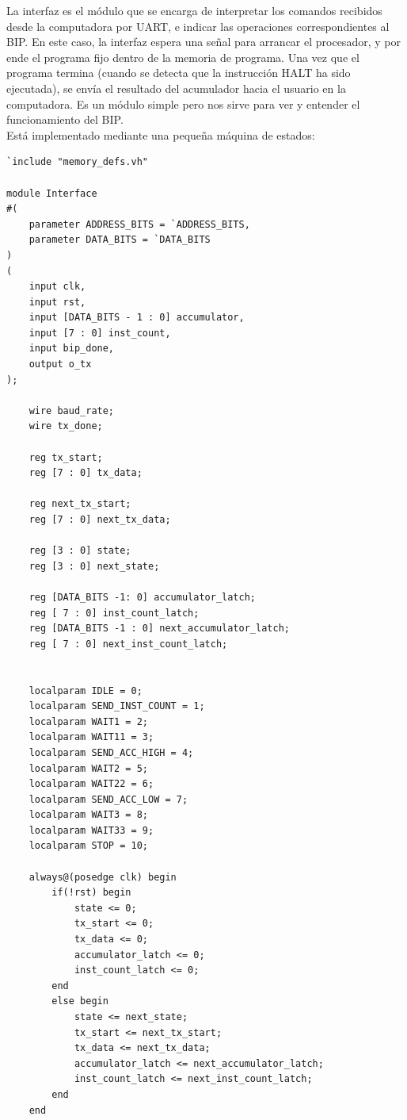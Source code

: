 \documentclass{article}
\begin{document}
La interfaz es el módulo que se encarga de interpretar los comandos recibidos desde la computadora
por UART, e indicar las operaciones correspondientes al BIP. En este caso, la interfaz espera una señal
para arrancar el procesador, y por ende el programa fijo dentro de la memoria de programa. Una vez que
el programa termina (cuando se detecta que la instrucción HALT ha sido ejecutada), se envía el resultado
del acumulador hacia el usuario en la computadora. Es un módulo simple pero nos sirve para ver y entender
el funcionamiento del BIP. \\

Está implementado mediante una pequeña máquina de estados:

\begin{shaded}
\begin{lstlisting}
`include "memory_defs.vh"

module Interface
#(
    parameter ADDRESS_BITS = `ADDRESS_BITS,
    parameter DATA_BITS = `DATA_BITS
)
(
    input clk,
    input rst,
    input [DATA_BITS - 1 : 0] accumulator,
    input [7 : 0] inst_count,
    input bip_done,
    output o_tx
);

    wire baud_rate;
    wire tx_done;

    reg tx_start;
    reg [7 : 0] tx_data;

    reg next_tx_start;
    reg [7 : 0] next_tx_data;

    reg [3 : 0] state;
    reg [3 : 0] next_state;

    reg [DATA_BITS -1: 0] accumulator_latch;
    reg [ 7 : 0] inst_count_latch;
    reg [DATA_BITS -1 : 0] next_accumulator_latch;
    reg [ 7 : 0] next_inst_count_latch;


    localparam IDLE = 0;
    localparam SEND_INST_COUNT = 1;
    localparam WAIT1 = 2;
    localparam WAIT11 = 3;
    localparam SEND_ACC_HIGH = 4;
    localparam WAIT2 = 5;
    localparam WAIT22 = 6;
    localparam SEND_ACC_LOW = 7;
    localparam WAIT3 = 8;
    localparam WAIT33 = 9;
    localparam STOP = 10;

    always@(posedge clk) begin
        if(!rst) begin
            state <= 0;
            tx_start <= 0;
            tx_data <= 0;
            accumulator_latch <= 0;
            inst_count_latch <= 0;
        end
        else begin
            state <= next_state;
            tx_start <= next_tx_start;
            tx_data <= next_tx_data;
            accumulator_latch <= next_accumulator_latch;
            inst_count_latch <= next_inst_count_latch;
        end
    end



\end{lstlisting}
\end{shaded}
\end{document}
